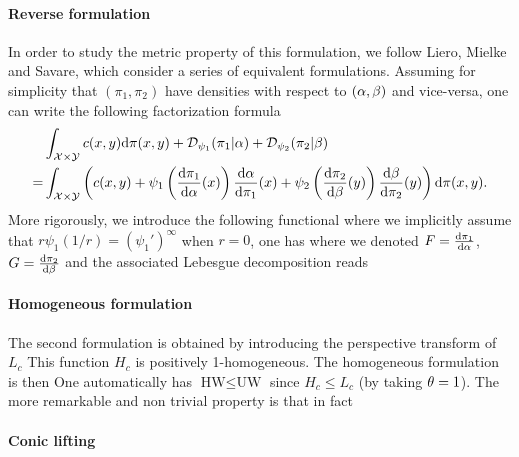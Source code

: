 \paragraph{Reverse formulation}

In order to study the metric property of this formulation, we follow Liero, Mielke and Savare, which consider a series of equivalent formulations. 
%
Assuming for simplicity that $(\pi_1,\pi_2)$ have densities with respect to $(\alpha,\beta)$ and vice-versa, one can write the following factorization formula
\begin{align*}
	& \int_{\mathcal{X} \times \mathcal{Y}} c(x,y) \mathrm{d}\pi(x,y)
		+ \mathcal{D}_{\psi_1}(\pi_1|\alpha) + \mathcal{D}_{\psi_2}(\pi_2|\beta) \\
		=&
	\int_{\mathcal{X} \times \mathcal{Y}} \left(  c(x,y)  + 
		\psi_1\left(  \frac{\mathrm{d}\pi_1}{\mathrm{d}\alpha}(x)  \right) \frac{\mathrm{d}\alpha}{\mathrm{d}\pi_1}(x) + 
		\psi_2\left(  \frac{\mathrm{d}\pi_2}{\mathrm{d}\beta}(y)  \right) \frac{\mathrm{d}\beta}{\mathrm{d}\pi_2}(y)
	 \right) \mathrm{d}\pi(x,y).
\end{align*}
More rigorously, we introduce the following functional
where we implicitly assume that $r\psi_1(1/r) = (\psi_1')^\infty$ when $r=0$, 
one has 
where we denoted $F=\frac{\mathrm{d}\pi_1}{\mathrm{d}\alpha}$, $G=\frac{\mathrm{d}\pi_2}{\mathrm{d}\beta}$ and the associated Lebesgue decomposition reads

\paragraph{Homogeneous formulation}

The second formulation is obtained by introducing the perspective transform of $L_c$
This function $H_c$ is positively 1-homogeneous.
%
The homogeneous formulation is then 
One automatically has $\text{HW} \leq \text{UW}$ since $H_c \leq L_c$ (by taking $\theta=1$). The more remarkable and non trivial property is that in fact 

\paragraph{Conic lifting}


